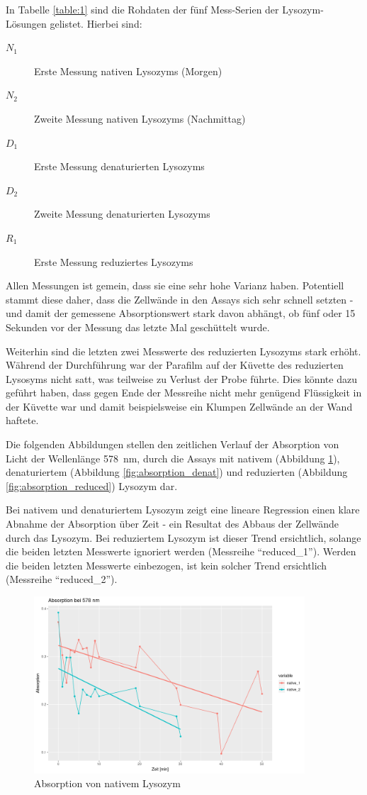\documentclass[a4paper,german]{scrreprt}
\begin{document}
In Tabelle \ref{table:1} sind die Rohdaten der fünf Mess-Serien der Lysozym-Lösungen gelistet. Hierbei sind:
\begin{description}
	\item[$N_1$] Erste Messung nativen Lysozyms (Morgen)
	\item[$N_2$] Zweite Messung nativen Lysozyms (Nachmittag)
	\item[$D_1$] Erste Messung denaturierten Lysozyms
	\item[$D_2$] Zweite Messung denaturierten Lysozyms
	\item[$R_1$] Erste Messung reduziertes Lysozyms
\end{description}

Allen Messungen ist gemein, dass sie eine sehr hohe Varianz haben. Potentiell
stammt diese daher, dass die Zellwände in den Assays sich sehr schnell setzten
- und damit der gemessene Absorptionswert stark davon abhängt, ob fünf oder 15
Sekunden vor der Messung das letzte Mal geschüttelt wurde.

Weiterhin sind die letzten zwei Messwerte des reduzierten Lysozyms stark
erhöht. Während der Durchführung war der Parafilm auf der Küvette des
reduzierten Lysosyms nicht satt, was teilweise zu Verlust der Probe führte.
Dies könnte dazu geführt haben, dass gegen Ende der Messreihe nicht mehr
genügend Flüssigkeit in der Küvette war und damit beispielsweise ein Klumpen
Zellwände an der Wand haftete.

Die folgenden Abbildungen stellen den zeitlichen Verlauf der Absorption von Licht der Wellenlänge \SI{578}{nm}, durch die Assays mit nativem (Abbildung \ref{fig:absorption_native}), denaturiertem (Abbildung \ref{fig:absorption_denat}) und reduzierten (Abbildung \ref{fig:absorption_reduced}) Lysozym dar.

Bei nativem und denaturiertem Lysozym zeigt eine lineare Regression einen klare
Abnahme der Absorption über Zeit - ein Resultat des Abbaus der Zellwände durch
das Lysozym. Bei reduziertem Lysozym ist dieser Trend ersichtlich, solange die
beiden letzten Messwerte ignoriert werden (Messreihe ``reduced\_1''). Werden
die beiden letzten Messwerte einbezogen, ist kein solcher Trend ersichtlich
(Messreihe ``reduced\_2'').

\begin{figure}[h]
	\centering
	\includegraphics[width=0.9\textwidth]{data/absorption_nativ}
	\caption{Absorption von nativem Lysozym}
	\label{fig:absorption_native}
\end{figure}
\end{document}

